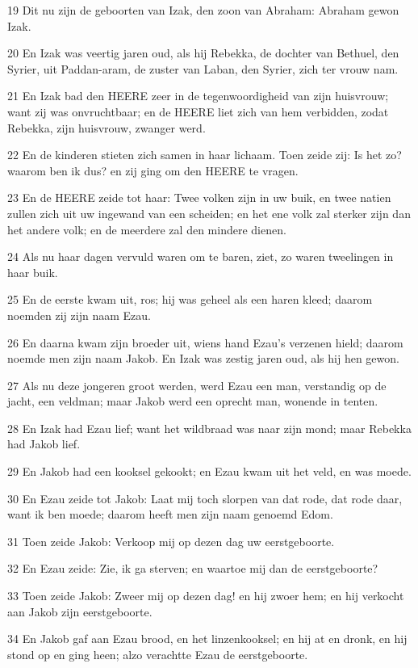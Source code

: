 \par 19 Dit nu zijn de geboorten van Izak, den zoon van Abraham: Abraham gewon Izak.
\par 20 En Izak was veertig jaren oud, als hij Rebekka, de dochter van Bethuel, den Syrier, uit Paddan-aram, de zuster van Laban, den Syrier, zich ter vrouw nam.
\par 21 En Izak bad den HEERE zeer in de tegenwoordigheid van zijn huisvrouw; want zij was onvruchtbaar; en de HEERE liet zich van hem verbidden, zodat Rebekka, zijn huisvrouw, zwanger werd.
\par 22 En de kinderen stieten zich samen in haar lichaam. Toen zeide zij: Is het zo? waarom ben ik dus? en zij ging om den HEERE te vragen.
\par 23 En de HEERE zeide tot haar: Twee volken zijn in uw buik, en twee natien zullen zich uit uw ingewand van een scheiden; en het ene volk zal sterker zijn dan het andere volk; en de meerdere zal den mindere dienen.
\par 24 Als nu haar dagen vervuld waren om te baren, ziet, zo waren tweelingen in haar buik.
\par 25 En de eerste kwam uit, ros; hij was geheel als een haren kleed; daarom noemden zij zijn naam Ezau.
\par 26 En daarna kwam zijn broeder uit, wiens hand Ezau's verzenen hield; daarom noemde men zijn naam Jakob. En Izak was zestig jaren oud, als hij hen gewon.
\par 27 Als nu deze jongeren groot werden, werd Ezau een man, verstandig op de jacht, een veldman; maar Jakob werd een oprecht man, wonende in tenten.
\par 28 En Izak had Ezau lief; want het wildbraad was naar zijn mond; maar Rebekka had Jakob lief.
\par 29 En Jakob had een kooksel gekookt; en Ezau kwam uit het veld, en was moede.
\par 30 En Ezau zeide tot Jakob: Laat mij toch slorpen van dat rode, dat rode daar, want ik ben moede; daarom heeft men zijn naam genoemd Edom.
\par 31 Toen zeide Jakob: Verkoop mij op dezen dag uw eerstgeboorte.
\par 32 En Ezau zeide: Zie, ik ga sterven; en waartoe mij dan de eerstgeboorte?
\par 33 Toen zeide Jakob: Zweer mij op dezen dag! en hij zwoer hem; en hij verkocht aan Jakob zijn eerstgeboorte.
\par 34 En Jakob gaf aan Ezau brood, en het linzenkooksel; en hij at en dronk, en hij stond op en ging heen; alzo verachtte Ezau de eerstgeboorte.

